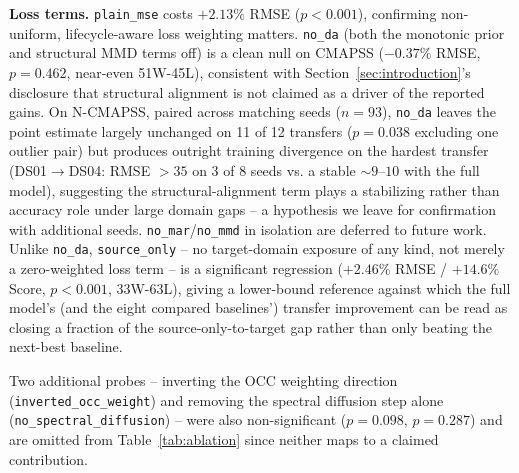 \textbf{Loss terms.} \texttt{plain\_mse} costs $+2.13\%$ RMSE ($p{<}0.001$), confirming non-uniform, lifecycle-aware loss weighting matters. \texttt{no\_da} (both the monotonic prior and structural MMD terms off) is a clean null on CMAPSS ($-0.37\%$ RMSE, $p=0.462$, near-even 51W-45L), consistent with Section~\ref{sec:introduction}'s disclosure that structural alignment is not claimed as a driver of the reported gains. On N-CMAPSS, paired across matching seeds ($n=93$), \texttt{no\_da} leaves the point estimate largely unchanged on 11 of 12 transfers ($p=0.038$ excluding one outlier pair) but produces outright training divergence on the hardest transfer (DS01$\to$DS04: RMSE $>35$ on 3 of 8 seeds vs. a stable $\sim\!9$--$10$ with the full model), suggesting the structural-alignment term plays a stabilizing rather than accuracy role under large domain gaps -- a hypothesis we leave for confirmation with additional seeds. \texttt{no\_mar}/\texttt{no\_mmd} in isolation are deferred to future work. Unlike \texttt{no\_da}, \texttt{source\_only} -- no target-domain exposure of any kind, not merely a zero-weighted loss term -- is a significant regression ($+2.46\%$ RMSE / $+14.6\%$ Score, $p{<}0.001$, 33W-63L), giving a lower-bound reference against which the full model's (and the eight compared baselines') transfer improvement can be read as closing a fraction of the source-only-to-target gap rather than only beating the next-best baseline.

Two additional probes -- inverting the OCC weighting direction (\texttt{inverted\_occ\_weight}) and removing the spectral diffusion step alone (\texttt{no\_spectral\_diffusion}) -- were also non-significant ($p=0.098$, $p=0.287$) and are omitted from Table~\ref{tab:ablation} since neither maps to a claimed contribution.
